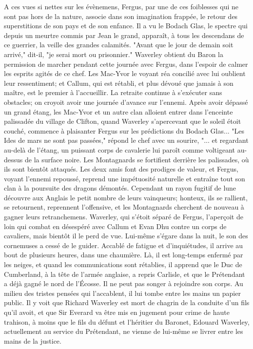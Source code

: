 {A ces vues si nettes sur les évènemens, Fergus, par une de ces foiblesses qui ne sont pas hors de la nature, associe dans son imagination frappée, le retour des superstitions de son pays et de son enfance. Il a vu le Bodach Glas, le spectre qui depuis un meurtre commis par Jean le grand, apparaît, à tous les descendans de ce guerrier, la veille des grandes calamités. "Avant que le jour de demain soit arrivé," dit-il, "je serai mort ou prisonnier."
Waverley obtient du Baron la permission de marcher pendant cette journée avec Fergus, dans l'espoir de calmer les esprits agités de ce chef. Les Mac-Yvor le voyant réa\setcounter{page}{367} concilié avec lui oublient leur ressentiment; et Callum, qui est rétabli, et plus dévoué que jamais à son maître, est le premier à l’accueillir. La retraite continue à s’exécuter sans obstacles; on croyoit avoir une journée d’avance sur l’ennemi. Après avoir dépassé un grand étang, les Mac-Yvor et un autre clan alloient entrer dans l’enceinte palissadée du village de Clifton, quand Waverley s’apercevant que le soleil étoit couché, commence à plaisanter Fergus sur les prédictions du Bodach Glas... "Les Ides de mars ne sont pas passées," répond le chef avec un sourire, "... et regardant au-delà de l’étang, un puissant corps de cavalerie lui paroît comme voltigeant au-dessus de la surface noire.
Les Montagnards se fortifient derrière les palissades, où ils sont bientôt attaqués. Les deux amis font des prodiges de valeur, et Fergus, voyant l’ennemi repoussé, reprend une impétuosité naturelle et entraîne tout son clan à la poursuite des dragons démontés. Cependant un rayon fugitif de lune découvre aux Anglais le petit nombre de leurs vainqueurs; honteux, ils se rallient, se retournent, reprennent l’offensive, et les Montagnards cherchent de nouveau à gagner leurs retranchemens. Waverley, qui s’étoit séparé de Fergus, l’aperçoit de loin qui combat en\setcounter{page}{368} désespéré avec Callum et Evan Dhu contre un corps de cavaliers, mais bientôt il le perd de vue. Lui-même s'égare dans la nuit, le son des cornemuses a cessé de le guider. Accablé de fatigue et d'inquiétudes, il arrive au bout de plusieurs heures, dans une chaumière. Là, il est long-temps enfermé par les neiges, et quand les communications sont rétablies, il apprend que le Duc de Cumberland, à la tête de l'armée anglaise, a repris Carlisle, et que le Prétendant a déjà gagné le nord de l'Écosse. Il ne peut pas songer à rejoindre son corps. Au milieu des tristes pensées qui l'accablent, il lui tombe entre les mains un papier public. Il y voit que Richard Waverley est mort de chagrin de la conduite d'un fils qu'il avoit, et que Sir Everard va être mis en jugement pour crime de haute trahison, à moins que le fils du défunt et l'héritier du Baronet, Edouard Waverley, actuellement au service du Prétendant, ne vienne de lui-même se livrer entre les mains de la justice.
}
